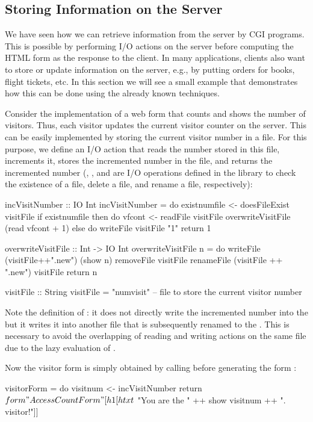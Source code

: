 \subsection{Storing Information on the Server}

We have seen how we can retrieve information from the server
by CGI programs. This is possible by performing I/O actions
on the server before computing the HTML form as the response to
the client. In many applications, clients also want to store
or update information on the server, e.g., by putting orders
for books, flight tickets, etc.
In this section we will see a small example that demonstrates
how this can be done using the already known techniques.

Consider the implementation of a web form that counts
and shows the number of visitors. Thus, each visitor
updates the current visitor counter on the server.
This can be easily implemented by storing the current
visitor number in a file.
For this purpose, we define an I/O action 
that reads the number stored in this file, increments it,
stores the incremented number
in the file, and returns the incremented number
(,
, and
 are
I/O operations defined in the library 
to check the existence of a file, delete a file, and
rename a file, respectively):\label{sec-overwriteVisitFile}
%
\begin{curry}
incVisitNumber :: IO Int
incVisitNumber = do
 existnumfile <- doesFileExist visitFile
 if existnumfile
   then do vfcont <- readFile visitFile
           overwriteVisitFile (read vfcont + 1)
   else do writeFile visitFile "1"
           return 1

overwriteVisitFile :: Int -> IO Int
overwriteVisitFile n = do
  writeFile (visitFile++".new") (show n)
  removeFile visitFile
  renameFile (visitFile ++ ".new") visitFile
  return n

visitFile :: String
visitFile = "numvisit"  -- file to store the current visitor number
\end{curry}
%
Note the definition of :
it does not directly write the incremented number
into the  but it writes it into another file that is
subsequently renamed to the .
This is necessary to avoid the overlapping of reading and writing actions
on the same file due to the lazy evaluation of .

Now the visitor form is simply obtained by calling 
before generating the form
:
%
\begin{curry}
visitorForm = do
  visitnum <- incVisitNumber
  return $ form "Access Count Form"
           [h1 [htxt $ "You are the " ++ show visitnum ++ ". visitor!"]]
\end{curry}



